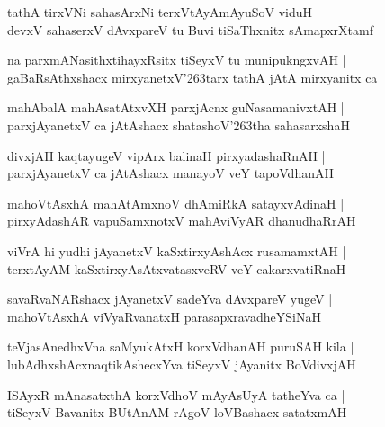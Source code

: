 \documentclass[twoside,12pt,openright]{book}
\def\S{\char'263}
\newcounter{shloka}[chapter]
\begin{document}
\begin{shloka}
tathA tirxVNi sahasArxNi terxVtAyAmAyuSoV viduH |\\
devxV sahaserxV dAvxpareV tu Buvi tiSaThxnitx sAmapxrXtamf
\end{shloka}

\begin{shloka}
na parxmANasithxtihayxRsitx tiSeyxV tu munipukngxvAH |\\
gaBaRsAthxshacx mirxyanetxV\S tarx tathA jAtA mirxyanitx ca 
\end{shloka}

\begin{shloka}
mahAbalA mahAsatAtxvXH parxjAcnx guNasamanivxtAH |\\
parxjAyanetxV ca jAtAshacx shatashoV\S tha sahasarxshaH
\end{shloka}

\begin{shloka}
divxjAH kaqtayugeV vipArx balinaH pirxyadashaRnAH |\\
parxjAyanetxV ca jAtAshacx manayoV veY tapoVdhanAH
\end{shloka}

\begin{shloka}
mahoVtAsxhA mahAtAmxnoV dhAmiRkA satayxvAdinaH |\\
pirxyAdashAR vapuSamxnotxV  mahAviVyAR dhanudhaRrAH
\end{shloka}

\begin{shloka}
viVrA hi yudhi jAyanetxV kaSxtirxyAshAcx rusamamxtAH |\\
terxtAyAM kaSxtirxyAsAtxvatasxveRV veY cakarxvatiRnaH
\end{shloka}

\begin{shloka}
savaRvaNARshacx jAyanetxV sadeYva dAvxpareV yugeV |\\
mahoVtAsxhA viVyaRvanatxH parasapxravadheYSiNaH
\end{shloka}

\begin{shloka}
teVjasAnedhxVna saMyukAtxH korxVdhanAH puruSAH kila |\\
lubAdhxshAcxnaqtikAshecxYva tiSeyxV jAyanitx BoVdivxjAH
\end{shloka}

\begin{shloka}
ISAyxR mAnasatxthA korxVdhoV mAyAsUyA tatheYva ca |\\
tiSeyxV Bavanitx BUtAnAM rAgoV loVBashacx satatxmAH
\end{shloka}
\end{document}
